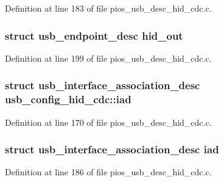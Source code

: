 \-Definition at line 183 of file pios\-\_\-usb\-\_\-desc\-\_\-hid\-\_\-cdc.\-c.

\hypertarget{group___p_i_o_s___u_s_b___d_e_s_c_ga0e5a30c27a737b9c3e117e4e8b755b8d}{
\subsubsection[{hid\-\_\-out}]{\setlength{\rightskip}{0pt plus 5cm}struct {\bf usb\-\_\-endpoint\-\_\-desc} {\bf hid\-\_\-out}}}\label{group___p_i_o_s___u_s_b___d_e_s_c_ga0e5a30c27a737b9c3e117e4e8b755b8d}


\-Definition at line 199 of file pios\-\_\-usb\-\_\-desc\-\_\-hid\-\_\-cdc.\-c.

\hypertarget{group___p_i_o_s___u_s_b___d_e_s_c_ga0dc1bab4cabd04ace89b858ba3f7b259}{
\subsubsection[{iad}]{\setlength{\rightskip}{0pt plus 5cm}struct {\bf usb\-\_\-interface\-\_\-association\-\_\-desc} {\bf usb\-\_\-config\-\_\-hid\-\_\-cdc\-::iad}}}\label{group___p_i_o_s___u_s_b___d_e_s_c_ga0dc1bab4cabd04ace89b858ba3f7b259}


\-Definition at line 170 of file pios\-\_\-usb\-\_\-desc\-\_\-hid\-\_\-cdc.\-c.

\hypertarget{group___p_i_o_s___u_s_b___d_e_s_c_gac7a66f23a9fc26df56f67aa5cc34dc5b}{
\subsubsection[{iad}]{\setlength{\rightskip}{0pt plus 5cm}struct {\bf usb\-\_\-interface\-\_\-association\-\_\-desc} {\bf iad}}}\label{group___p_i_o_s___u_s_b___d_e_s_c_gac7a66f23a9fc26df56f67aa5cc34dc5b}


\-Definition at line 186 of file pios\-\_\-usb\-\_\-desc\-\_\-hid\-\_\-cdc.\-c.

